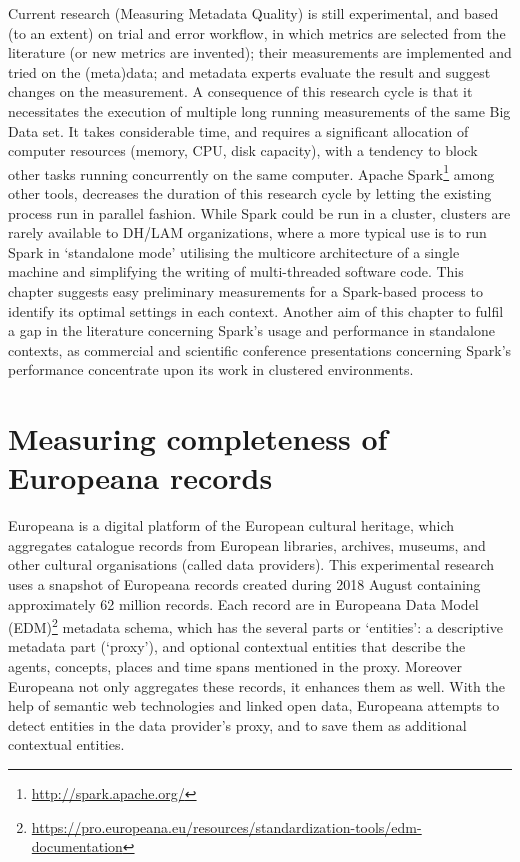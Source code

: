Current research (Measuring Metadata Quality) is still experimental, and based (to an extent) on trial and error workflow, in which metrics are selected from the literature  (or new metrics are invented); their measurements are implemented and tried on the (meta)data; and metadata experts evaluate the result and suggest changes on the measurement. A consequence of this research cycle is that it necessitates the execution of multiple long running measurements of the same Big Data set. It takes considerable time, and requires a significant allocation of computer resources (memory, CPU, disk capacity), with a tendency to block other tasks running concurrently on the same computer. Apache Spark\footnote{\url{http://spark.apache.org/}} among other tools, decreases the duration of this research cycle by letting the existing process run in parallel fashion. While Spark could be run in a cluster, clusters are rarely available to DH/LAM organizations, where a more typical use is to run Spark in `standalone mode' utilising the multicore architecture of a single machine and simplifying the writing of multi-threaded software code. This chapter suggests easy preliminary measurements for a Spark-based process to identify its optimal settings in each context. Another aim of this chapter to fulfil a gap in the literature concerning Spark’s usage and performance in standalone contexts, as commercial and scientific conference presentations concerning Spark’s performance concentrate upon its work in clustered environments.

\section{Measuring completeness of Europeana records}

Europeana is a digital platform of the European cultural heritage, which aggregates catalogue records from European libraries, archives, museums, and other cultural organisations (called data providers). This experimental research uses a snapshot of Europeana records created during 2018 August containing approximately 62 million records. Each record are in Europeana Data Model (EDM)\footnote{\url{https://pro.europeana.eu/resources/standardization-tools/edm-documentation}} metadata schema, which has the several parts or `entities': a descriptive metadata part (`proxy'), and optional contextual entities that describe the agents, concepts, places and time spans mentioned in the proxy. Moreover Europeana not only aggregates these records, it enhances them as well. With the help of semantic web technologies and linked open data, Europeana attempts to detect entities in the data provider's proxy, and to save them as additional contextual entities.


